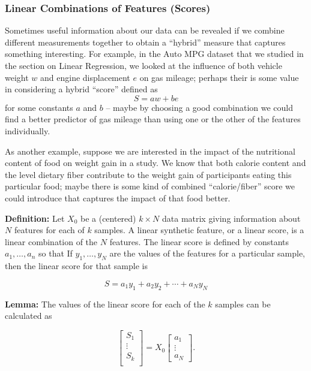 \documentclass[
]{article}
\begin{document}
\hypertarget{linear-combinations-of-features-scores}{%
\subsubsection{Linear Combinations of Features
(Scores)}\label{linear-combinations-of-features-scores}}

Sometimes useful information about our data can be revealed if we
combine different measurements together to obtain a ``hybrid'' measure
that captures something interesting. For example, in the Auto MPG
dataset that we studied in the section on Linear Regression, we looked
at the influence of both vehicle weight \(w\) and engine displacement
\(e\) on gas mileage; perhaps their is some value in considering a
hybrid ``score'' defined as \[
S = aw + be
\] for some constants \(a\) and \(b\) -- maybe by choosing a good
combination we could find a better predictor of gas mileage than using
one or the other of the features individually.

As another example, suppose we are interested in the impact of the
nutritional content of food on weight gain in a study. We know that both
calorie content and the level dietary fiber contribute to the weight
gain of participants eating this particular food; maybe there is some
kind of combined ``calorie/fiber'' score we could introduce that
captures the impact of that food better.

\textbf{Definition:} Let \(X_{0}\) be a (centered) \(k\times N\) data
matrix giving information about \(N\) features for each of \(k\)
samples. A linear synthetic feature, or a linear score, is a linear
combination of the \(N\) features. The linear score is defined by
constants \(a_{1},\ldots, a_{n}\) so that If \(y_{1},\ldots, y_{N}\) are
the values of the features for a particular sample, then the linear
score for that sample is

\[
S = a_{1}y_{1}+a_{2}y_{2}+\cdots+a_{N}y_{N}
\]

\textbf{Lemma:} The values of the linear score for each of the \(k\)
samples can be calculated as

\begin{equation}
\left[\begin{matrix} S_{1} \\ \vdots \\ S_{k}\\ \end{matrix}\right] =
X_{0}\left[
\begin{matrix} a_{1} \\ \vdots \\ a_{N}\end{matrix}\right].
\label{eq:linearscore}\end{equation}
\end{document}
